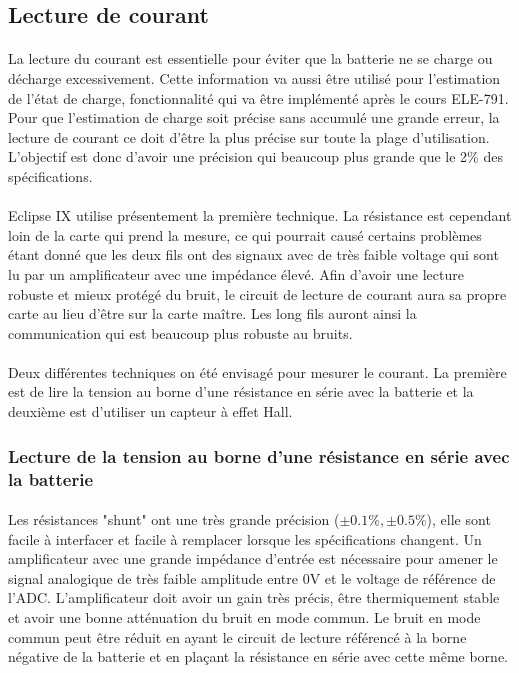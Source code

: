 
\subsection{Lecture de courant}
	\paragraph*{}
	La lecture du courant est essentielle pour éviter que la batterie ne se charge ou décharge excessivement. Cette information va aussi être utilisé pour l'estimation de l'état de charge, fonctionnalité qui va être implémenté après le cours ELE-791. Pour que l'estimation de charge soit précise sans accumulé une grande erreur, la lecture de courant ce doit d'être la plus précise sur toute la plage d'utilisation. L'objectif est donc d'avoir une précision qui beaucoup plus grande que le 2\% des spécifications. 
	
	\paragraph*{}
	Eclipse IX utilise présentement la première technique. La résistance est cependant loin de la carte qui prend la mesure, ce qui pourrait causé certains problèmes étant donné que les deux fils ont des signaux avec de très faible voltage qui sont lu par un amplificateur avec une impédance élevé. Afin d'avoir une lecture robuste et mieux protégé du bruit, le circuit de lecture de courant aura sa propre carte au lieu d'être sur la carte maître. Les long fils auront ainsi la communication qui est beaucoup plus robuste au bruits. 
	
	\paragraph*{}
	Deux différentes techniques on été envisagé pour mesurer le courant. La première est de lire la tension au borne d'une résistance en série avec la batterie et la deuxième est d'utiliser un capteur à effet Hall. 
	
	
	\subsubsection*{Lecture de la tension au borne d'une résistance en série avec la batterie}
	\paragraph*{}
	Les résistances "shunt" ont une très grande précision ($\pm 0.1 \% , \pm 0.5 \%$), elle sont facile à interfacer et facile à remplacer lorsque les spécifications changent. Un amplificateur avec une grande impédance d'entrée est nécessaire pour amener le signal analogique de très faible amplitude entre 0V et le voltage de référence de l'ADC. L'amplificateur doit avoir un gain très précis, être thermiquement stable et avoir une bonne atténuation du bruit en mode commun. Le bruit en mode commun peut être réduit en ayant le circuit de lecture référencé à la borne négative de la batterie et en plaçant la résistance en série avec cette même borne.
		
